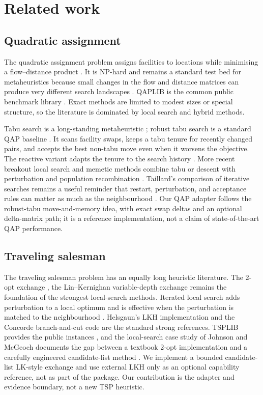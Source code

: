 \documentclass[11pt]{article}
\begin{document}
\section{Related work}
\label{sec:related}

\subsection{Quadratic assignment}

The quadratic assignment problem assigns facilities to locations while minimising a flow--distance
product \citep{koopmans1957}. It is NP-hard \citep{sahni1976,garey1979} and remains a standard test bed for
metaheuristics because small changes in the flow and distance matrices can produce very different
search landscapes \citep{loiola2007}. QAPLIB is the common public benchmark library
\citep{burkard1997}. Exact methods are limited to modest sizes or special structure, so the literature
is dominated by local search and hybrid methods.

Tabu search is a long-standing metaheuristic \citep{glover1989}; robust tabu search is a standard QAP baseline \citep{taillard1991}. It scans facility swaps, keeps a
tabu tenure for recently changed pairs, and accepts the best non-tabu move even when it worsens the
objective. The reactive variant adapts the tenure to the search history \citep{battiti1994}. More
recent breakout local search and memetic methods combine tabu or descent with perturbation and
population recombination \citep{benlic2013}. Taillard's comparison of iterative searches remains a
useful reminder that restart, perturbation, and acceptance rules can matter as much as the
neighbourhood \citep{taillard1995}. Our QAP adapter follows the robust-tabu move-and-memory idea, with
exact swap deltas and an optional delta-matrix path; it is a reference implementation, not a claim of
state-of-the-art QAP performance.

\subsection{Traveling salesman}

The traveling salesman problem has an equally long heuristic literature. The 2-opt exchange \citep{croes1958}, the Lin--Kernighan
variable-depth exchange \citep{lin1973} remains the foundation of the strongest local-search methods.
Iterated local search adds perturbation to a local optimum and is effective when the perturbation is
matched to the neighbourhood \citep{lourenco2003}. Helsgaun's LKH implementation
\citep{helsgaun2000} and the Concorde branch-and-cut code \citep{applegate2006} are the standard strong
references. TSPLIB provides the public instances \citep{reinelt1991}, and the local-search case study
of Johnson and McGeoch documents the gap between a textbook 2-opt implementation and a carefully
engineered candidate-list method \citep{johnson1997}. We implement a bounded candidate-list
LK-style exchange and use external LKH only as an optional capability reference, not as part of the
package. Our contribution is the adapter and evidence boundary, not a new TSP heuristic.
\end{document}
